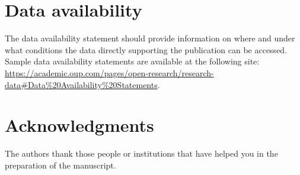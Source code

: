 \section*{Data availability}
The data availability statement should provide information on where and under what conditions the data directly supporting the publication can be accessed. Sample data availability statements are available at the following site: \url{https://academic.oup.com/pages/open-research/research-data#Data%20Availability%20Statements}.

\section*{Acknowledgments}
The authors thank those people or institutions that have helped you in the preparation of the manuscript.

